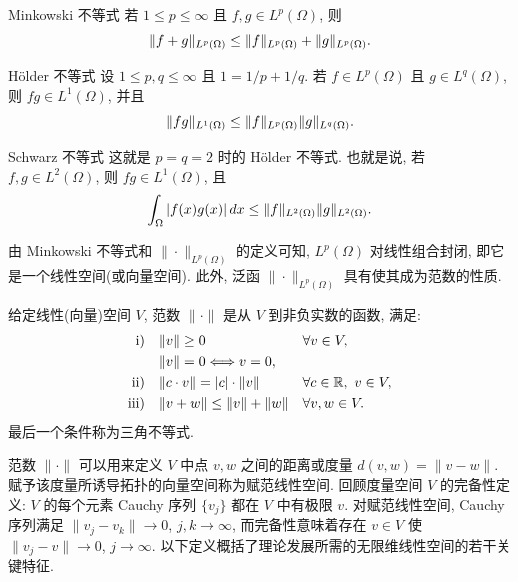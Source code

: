\setcounter{thmcount}{2}
\begin{MBNamedStatement}{Minkowski 不等式}
\label{thm:ch01-minkowski-inequality}
若 $1\leq p\leq\infty$ 且 $f,g\in L^p(\Omega)$, 则
\[
\MathBookFormulaID{formula-ch01-minkowski-inequality}
\|f+g\|_{L^p(\Omega)}\leq\|f\|_{L^p(\Omega)}+\|g\|_{L^p(\Omega)}.
\]
\end{MBNamedStatement}

\begin{MBNamedStatement}{Hölder 不等式}
\label{thm:ch01-holder-inequality}
设 $1\leq p,q\leq\infty$ 且 $1=1/p+1/q$. 若 $f\in L^p(\Omega)$ 且 $g\in L^q(\Omega)$, 则 $fg\in L^1(\Omega)$, 并且
\[
\MathBookFormulaID{formula-ch01-holder-inequality}
\|fg\|_{L^1(\Omega)}\leq\|f\|_{L^p(\Omega)}\|g\|_{L^q(\Omega)}.
\]
\end{MBNamedStatement}

\begin{MBNamedStatement}{Schwarz 不等式}
\label{thm:ch01-schwarz-inequality}
这就是 $p=q=2$ 时的 Hölder 不等式. 也就是说, 若 $f,g\in L^2(\Omega)$, 则 $fg\in L^1(\Omega)$, 且
\[
\MathBookFormulaID{formula-ch01-schwarz-integral-inequality}
\int_\Omega|f(x)g(x)|\,dx\leq\|f\|_{L^2(\Omega)}\|g\|_{L^2(\Omega)}.
\]
\end{MBNamedStatement}

由 Minkowski 不等式和 $\|\cdot\|_{L^p(\Omega)}$ 的定义可知, $L^p(\Omega)$ 对线性组合封闭, 即它是一个线性空间(或向量空间). 此外, 泛函 $\|\cdot\|_{L^p(\Omega)}$ 具有使其成为范数的性质.

\begin{Definition}
\label{def:ch01-norm}
给定线性(向量)空间 $V$, 范数 $\|\cdot\|$ 是从 $V$ 到非负实数的函数, 满足:
\[
\MathBookFormulaID{formula-ch01-norm-axioms}
\begin{aligned}
\mathrm{i)}\quad&\|v\|\geq0 &&\forall v\in V,\\
&\|v\|=0\Longleftrightarrow v=0,\\
\mathrm{ii)}\quad&\|c\cdot v\|=|c|\cdot\|v\| &&\forall c\in\mathbb R,\ v\in V,\\
\mathrm{iii)}\quad&\|v+w\|\leq\|v\|+\|w\| &&\forall v,w\in V.
\end{aligned}
\]
最后一个条件称为三角不等式.
\end{Definition}



范数 $\|\cdot\|$ 可以用来定义 $V$ 中点 $v,w$ 之间的距离或度量 $d(v,w)=\|v-w\|$. 赋予该度量所诱导拓扑的向量空间称为赋范线性空间. 回顾度量空间 $V$ 的完备性定义: $V$ 的每个元素 Cauchy 序列 $\{v_j\}$ 都在 $V$ 中有极限 $v$. 对赋范线性空间, Cauchy 序列满足 $\|v_j-v_k\|\to0$, $j,k\to\infty$, 而完备性意味着存在 $v\in V$ 使 $\|v_j-v\|\to0$, $j\to\infty$. 以下定义概括了理论发展所需的无限维线性空间的若干关键特征.

